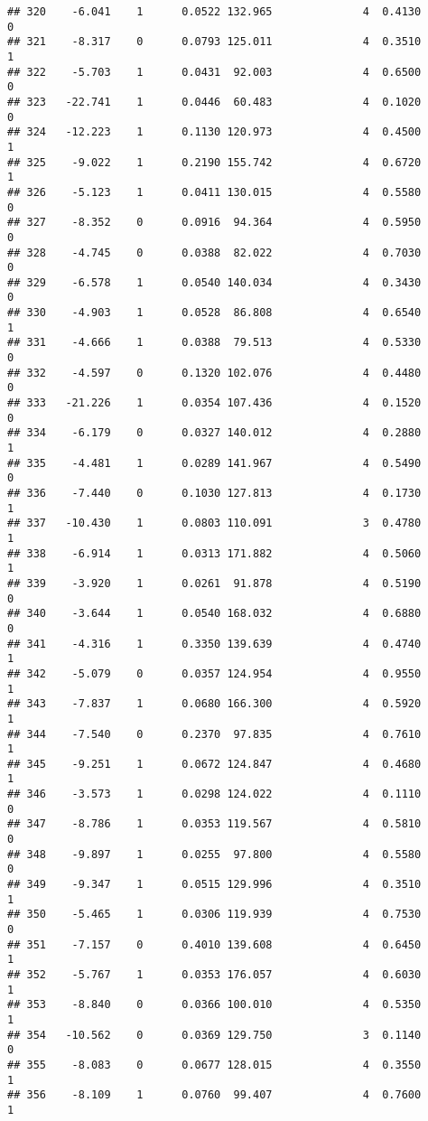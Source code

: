 \documentclass[
]{article}
\begin{document}
\begin{verbatim}
## 320    -6.041    1      0.0522 132.965              4  0.4130      0
## 321    -8.317    0      0.0793 125.011              4  0.3510      1
## 322    -5.703    1      0.0431  92.003              4  0.6500      0
## 323   -22.741    1      0.0446  60.483              4  0.1020      0
## 324   -12.223    1      0.1130 120.973              4  0.4500      1
## 325    -9.022    1      0.2190 155.742              4  0.6720      1
## 326    -5.123    1      0.0411 130.015              4  0.5580      0
## 327    -8.352    0      0.0916  94.364              4  0.5950      0
## 328    -4.745    0      0.0388  82.022              4  0.7030      0
## 329    -6.578    1      0.0540 140.034              4  0.3430      0
## 330    -4.903    1      0.0528  86.808              4  0.6540      1
## 331    -4.666    1      0.0388  79.513              4  0.5330      0
## 332    -4.597    0      0.1320 102.076              4  0.4480      0
## 333   -21.226    1      0.0354 107.436              4  0.1520      0
## 334    -6.179    0      0.0327 140.012              4  0.2880      1
## 335    -4.481    1      0.0289 141.967              4  0.5490      0
## 336    -7.440    0      0.1030 127.813              4  0.1730      1
## 337   -10.430    1      0.0803 110.091              3  0.4780      1
## 338    -6.914    1      0.0313 171.882              4  0.5060      1
## 339    -3.920    1      0.0261  91.878              4  0.5190      0
## 340    -3.644    1      0.0540 168.032              4  0.6880      0
## 341    -4.316    1      0.3350 139.639              4  0.4740      1
## 342    -5.079    0      0.0357 124.954              4  0.9550      1
## 343    -7.837    1      0.0680 166.300              4  0.5920      1
## 344    -7.540    0      0.2370  97.835              4  0.7610      1
## 345    -9.251    1      0.0672 124.847              4  0.4680      1
## 346    -3.573    1      0.0298 124.022              4  0.1110      0
## 347    -8.786    1      0.0353 119.567              4  0.5810      0
## 348    -9.897    1      0.0255  97.800              4  0.5580      0
## 349    -9.347    1      0.0515 129.996              4  0.3510      1
## 350    -5.465    1      0.0306 119.939              4  0.7530      0
## 351    -7.157    0      0.4010 139.608              4  0.6450      1
## 352    -5.767    1      0.0353 176.057              4  0.6030      1
## 353    -8.840    0      0.0366 100.010              4  0.5350      1
## 354   -10.562    0      0.0369 129.750              3  0.1140      0
## 355    -8.083    0      0.0677 128.015              4  0.3550      1
## 356    -8.109    1      0.0760  99.407              4  0.7600      1

\end{verbatim}
\end{document}
